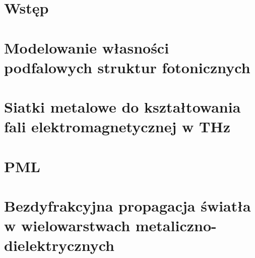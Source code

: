 \documentclass[pdflatex,11pt]{aghdpl}
\author{Marcin Stolarek}
\date{2014}
\begin{document}
\titlepages

\tableofcontents
\clearpage

\chapter{Wstęp}



\chapter{Modelowanie własności podfalowych struktur fotonicznych}


\chapter{Siatki metalowe do kształtowania fali elektromagnetycznej w THz }



\chapter{PML}


\chapter{Bezdyfrakcyjna propagacja światła w wielowarstwach metaliczno-dielektrycznych}







% 
% 


%
%
%
%
\end{document}
